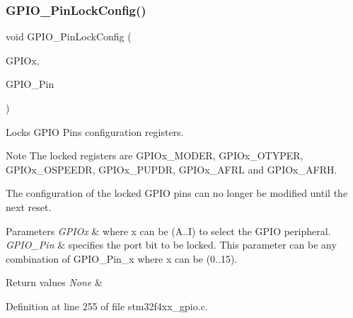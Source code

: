 \subsubsection{\texorpdfstring{G\+P\+I\+O\+\_\+\+Pin\+Lock\+Config()}{GPIO\_PinLockConfig()}}
{\footnotesize\ttfamily void G\+P\+I\+O\+\_\+\+Pin\+Lock\+Config (\begin{DoxyParamCaption}\item[{\hyperlink{struct_g_p_i_o___type_def}{G\+P\+I\+O\+\_\+\+Type\+Def} $\ast$}]{G\+P\+I\+Ox,  }\item[{uint16\+\_\+t}]{G\+P\+I\+O\+\_\+\+Pin }\end{DoxyParamCaption})}



Locks G\+P\+IO Pins configuration registers. 

\begin{DoxyNote}{Note}
The locked registers are G\+P\+I\+Ox\+\_\+\+M\+O\+D\+ER, G\+P\+I\+Ox\+\_\+\+O\+T\+Y\+P\+ER, G\+P\+I\+Ox\+\_\+\+O\+S\+P\+E\+E\+DR, G\+P\+I\+Ox\+\_\+\+P\+U\+P\+DR, G\+P\+I\+Ox\+\_\+\+A\+F\+RL and G\+P\+I\+Ox\+\_\+\+A\+F\+RH. 

The configuration of the locked G\+P\+IO pins can no longer be modified until the next reset. 
\end{DoxyNote}

\begin{DoxyParams}{Parameters}
{\em G\+P\+I\+Ox} & where x can be (A..I) to select the G\+P\+IO peripheral. \\
\hline
{\em G\+P\+I\+O\+\_\+\+Pin} & specifies the port bit to be locked. This parameter can be any combination of G\+P\+I\+O\+\_\+\+Pin\+\_\+x where x can be (0..15). \\
\hline
\end{DoxyParams}

\begin{DoxyRetVals}{Return values}
{\em None} & \\
\hline
\end{DoxyRetVals}


Definition at line 255 of file stm32f4xx\+\_\+gpio.\+c.

\mbox{\label{group___g_p_i_o___group1_gab28de41278e7f8c63d0851e2733b10df}} 
